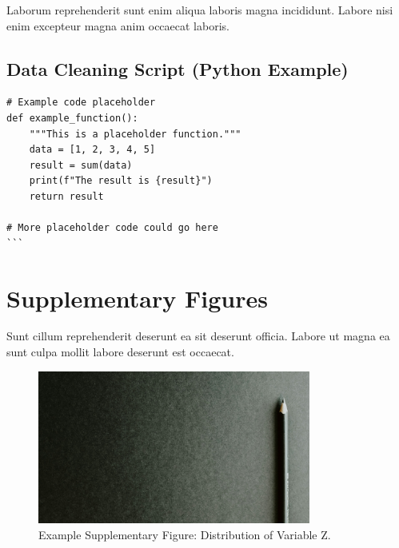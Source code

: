 \begin{theappendices}
  Laborum reprehenderit sunt enim aliqua laboris magna incididunt. Labore nisi enim excepteur magna anim occaecat laboris.

  \section{Data Cleaning Script (Python Example)}
\begin{verbatim}
# Example code placeholder
def example_function():
    """This is a placeholder function."""
    data = [1, 2, 3, 4, 5]
    result = sum(data)
    print(f"The result is {result}")
    return result

# More placeholder code could go here
```
\end{verbatim}

  \chapter{Supplementary Figures}
  \label{app:sup_figures}

  Sunt cillum reprehenderit deserunt ea sit deserunt officia. Labore ut magna ea sunt culpa mollit labore deserunt est occaecat.

  \begin{figure}[h]
    \centering
    \includegraphics[width=0.8\textwidth]{figures/placeholder-figure.jpg}
    \caption{Example Supplementary Figure: Distribution of Variable Z.}
    \label{fig:appendix_figure}
  \end{figure}

\end{theappendices}